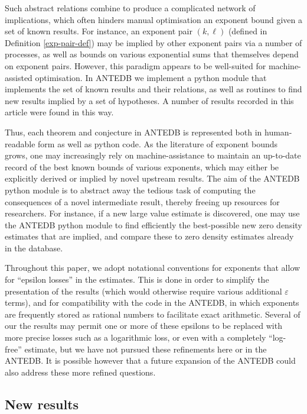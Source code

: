 \documentclass[a4paper, 10pt]{amsart}
\newcommand{\eps}{\varepsilon}
\begin{document}
Such abstract relations combine to produce a complicated network of implications, which often hinders manual optimisation an exponent bound given a set of known results. For instance, an exponent pair $(k, \ell)$ (defined in Definition \ref{exp-pair-def}) may be implied by other exponent pairs via a number of processes, as well as bounds on various exponential sums that themselves depend on exponent pairs. However, this paradigm appears to be well-suited for machine-assisted optimisation. In ANTEDB we implement a python module that implements the set of known results and their relations, as well as routines to find new results implied by a set of hypotheses. A number of results recorded in this article were found in this way. 

Thus, each theorem and conjecture in ANTEDB is represented both in human-readable form as well as python code. As the literature of exponent bounds grows, one may increasingly rely on machine-assistance to  maintain an up-to-date record of the best known bounds of various exponents, which may either be explicitly derived or implied by novel upstream results. The aim of the ANTEDB python module is to abstract away the tedious task of computing the consequences of a novel intermediate result, thereby freeing up resources for researchers. For instance, if a new large value estimate is discovered, one may use the ANTEDB python module to find efficiently the best-possible new zero density estimates that are implied, and compare these to zero density estimates already in the database.

\begin{remark}\label{epsilon-loss}  Throughout this paper, we adopt notational conventions for exponents that allow for ``epsilon losses'' in the estimates.  This is done in order to simplify the presentation of the results (which would otherwise require various additional $\eps$ terms), and for compatibility with the code in the ANTEDB, in which exponents are frequently stored as rational numbers to facilitate exact arithmetic.  Several of our the results  may permit one or more of these epsilons to be replaced with more precise losses such as a logarithmic loss, or even with a completely ``log-free'' estimate, but we have not pursued these refinements here or in the ANTEDB.  It is possible however that a future expansion of the ANTEDB could also address these more refined questions.
\end{remark}


\subsection{New results}
\end{document}

